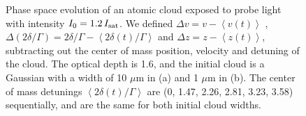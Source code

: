 \documentclass[12pt]{iopart}
\begin{document}
\begin{figure}
\caption{Phase space evolution of an atomic cloud exposed to probe light with intensity $I_0=1.2\, I_{\rm{sat}}$. We defined $\Delta v=v -\left< v(t) \right>$ ,  $\Delta (2\delta/\Gamma)=2\delta/\Gamma -\left< 2\delta(t)/\Gamma \right>$ and $\Delta z=z-\left< z(t) \right>$, subtracting out the center of mass position, velocity and detuning of the cloud. The optical depth is 1.6, and the initial cloud is a Gaussian with a width of 10 $\mu$m in (a) and 1 $\mu$m in (b). The center of mass detunings $\left< 2\delta(t)/\Gamma \right>$ are (0,  1.47,  2.26,  2.81,  3.23, 3.58) sequentially, and are the same for both initial cloud widths. }  
\label{fig:phaseSpace}
\end{figure}
\end{document}
